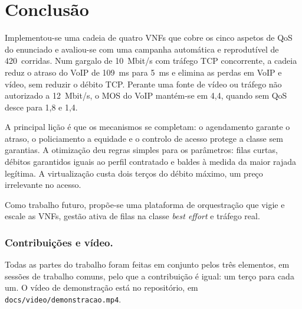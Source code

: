 \documentclass[a4paper]{llncs}
\begin{document}
\section{Conclusão}
\label{sec:conc}

Implementou-se uma cadeia de quatro VNFs que cobre os cinco aspetos de QoS do
enunciado e avaliou-se com uma campanha automática e reprodutível de 420~corridas. Num gargalo de 10~Mbit/s com
tráfego TCP concorrente, a cadeia reduz o atraso do VoIP de 109~ms para 5~ms e
elimina as perdas em VoIP e vídeo, sem reduzir o débito TCP. Perante uma
fonte de vídeo ou tráfego não autorizado a 12~Mbit/s, o MOS do VoIP mantém-se em
4,4, quando sem QoS desce para 1,8 e 1,4.

A principal lição é que os mecanismos se completam: o agendamento garante o atraso,
o policiamento a equidade e o controlo de acesso protege a classe sem garantias. A
otimização deu regras simples para os parâmetros: filas curtas, débitos garantidos
iguais ao perfil contratado e baldes à medida da maior rajada legítima. A
virtualização custa dois terços do débito máximo, um preço irrelevante no acesso.

Como trabalho futuro, propõe-se uma plataforma de orquestração que vigie e escale
as VNFs, gestão ativa de filas na classe \emph{best effort} e tráfego real.

\subsubsection*{Contribuições e vídeo.}
Todas as partes do trabalho foram feitas em conjunto pelos três elementos, em sessões
de trabalho comuns, pelo que a contribuição é igual: um terço para cada um. O vídeo de
demonstração está no repositório, em \texttt{docs/video/demonstracao.mp4}.
\end{document}
